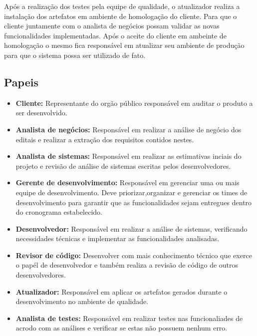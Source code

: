 \documentclass[	DIV=calc,%
							paper=a4,%
							fontsize=12pt,%
							onecolumn]{scrartcl}	 					%
\begin{document}
Após a realização dos testes pela equipe de qualidade, o atualizador realiza a instalação dos artefatos em ambiente de homologação do cliente. Para que o cliente juntamente
com o analista de negócios possam validar as novas funcionalidades implementadas. Após o aceite do cliente em ambeinte de homologação o mesmo fica responsável em atualizar
seu ambiente de produção para que o sistema possa ser utilizado de fato.

\subsection{Papeis}
\begin{itemize}
	\item \textbf{Cliente:} Representante do orgão público responsável em auditar o produto a ser desenvolvido.
	\item \textbf{Analista de negócios:} Responsável em realizar a análise de negócio dos editais e realizar a extração dos requisitos contidos nestes.
	\item \textbf{Analista de sistemas:} Responsável em realizar as estimativas inciais do projeto e revisão de análise de sistemas escritas pelos desenvolvedores.
	\item \textbf{Gerente de desenvolvimento:} Responsável em gerenciar uma ou mais equipe de desenvolvimento. Deve priorizar,organizar e gerenciar 
	os times de desenvolvimento para garantir que as funcionalidades sejam entregues dentro do cronograma estabelecido.
	\item \textbf{Desenvolvedor:} Responsável em realizar a análise de sistemas, verificando necessidades técnicas e implementar as funcionalidades analisadas.
	\item \textbf{Revisor de código:} Desenvolver com mais conhecimento técnico que exerce o papél de desenvolvedor e também realiza 
	a revisão de código de outros desenvolvedores.
	\item \textbf{Atualizador:} Responsável em aplicar os artefatos gerados durante o desenvolvimento no ambiente de qualidade.
	\item \textbf{Analista de testes:} Responsável em realizar testes nas funcionaliades de acrodo com as análises e verificar se estas não possuem nenhum erro.
\end{itemize}
\end{document}
